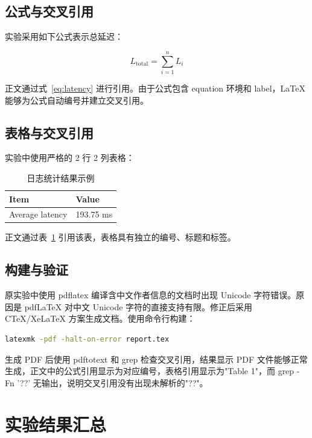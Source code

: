 \documentclass[UTF8]{ctexart}
\begin{document}
\subsection{公式与交叉引用}

实验采用如下公式表示总延迟：

\begin{equation}
L_{\mathrm{total}} = \sum_{i=1}^{n} L_i
\label{eq:latency}
\end{equation}

正文通过式~\eqref{eq:latency} 进行引用。由于公式包含 equation 环境和 label，LaTeX 能够为公式自动编号并建立交叉引用。

\subsection{表格与交叉引用}

实验中使用严格的 2 行 2 列表格：

\begin{table}[htbp]
\centering
\caption{日志统计结果示例}
\label{tab:result}
\begin{tabular}{ll}
\toprule
Item & Value \\
\midrule
Average latency & 193.75 ms \\
\bottomrule
\end{tabular}
\end{table}

正文通过表~\ref{tab:result} 引用该表，表格具有独立的编号、标题和标签。

\subsection{构建与验证}

原实验中使用 pdflatex 编译含中文作者信息的文档时出现 Unicode 字符错误。原因是 pdfLaTeX 对中文 Unicode 字符的直接支持有限。修正后采用 CTeX/XeLaTeX 方案生成文档。使用命令行构建：

\begin{lstlisting}[language=bash]
latexmk -pdf -halt-on-error report.tex
\end{lstlisting}

生成 PDF 后使用 pdftotext 和 grep 检查交叉引用，结果显示 PDF 文件能够正常生成，正文中的公式引用显示为对应编号，表格引用显示为"Table 1"，而 grep -Fn '??' 无输出，说明交叉引用没有出现未解析的"??"。

\section{实验结果汇总}
\end{document}
